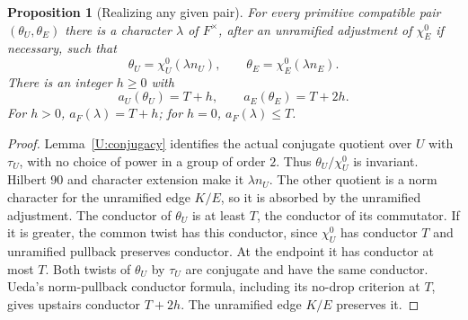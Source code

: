 \documentclass[11pt]{amsart}
\newtheorem{proposition}[theorem]{Proposition}
\theoremstyle{definition}
\theoremstyle{remark}
\begin{document}
\begin{proposition}[Realizing any given pair]\label{D:UR:actual}
For every primitive compatible pair $(\theta_U,\theta_E)$ there is a
character $\lambda$ of $F^\times$, after an unramified adjustment of
$\chi_E^0$ if necessary, such that
\begin{equation}\label{D:UR:twistpair}
 \theta_U=\chi_U^0(\lambda n_U),\qquad
 \theta_E=\chi_E^0(\lambda n_E).
\end{equation}
There is an integer $h\ge0$ with
\begin{equation}\label{D:UR:conductors}
 a_U(\theta_U)=T+h,\qquad a_E(\theta_E)=T+2h.
\end{equation}
For $h>0$, $a_F(\lambda)=T+h$; for $h=0$, $a_F(\lambda)\le T$.
\end{proposition}
\begin{proof}
Lemma~\ref{U:conjugacy} identifies the actual conjugate quotient over $U$ with
$\tau_U$, with no choice of power in a group of order $2$.
Thus $\theta_U/\chi_U^0$ is invariant. Hilbert 90 and character extension
make it $\lambda n_U$. The other quotient is a norm character for the
unramified edge $K/E$, so it is absorbed by the unramified adjustment.
The conductor of $\theta_U$ is at least $T$, the conductor of its
commutator. If it is greater, the common twist has this conductor, since
$\chi_U^0$ has conductor $T$ and unramified pullback preserves conductor.
At the endpoint it has conductor at most $T$. Both twists of $\theta_U$
by $\tau_U$ are conjugate and have the same conductor. Ueda's norm-pullback
conductor formula, including its no-drop criterion at $T$, gives upstairs
conductor $T+2h$. The unramified edge $K/E$ preserves it.
\end{proof}
\end{document}
